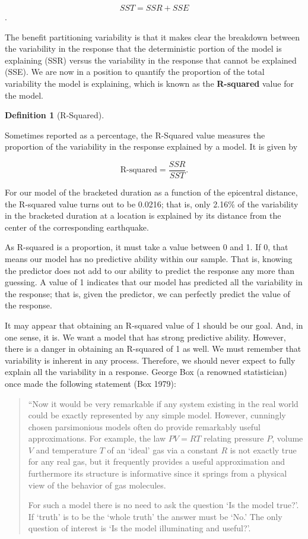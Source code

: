 \documentclass[
  letterpaper,
  DIV=11,
  numbers=noendperiod]{scrreprt}
\theoremstyle{definition}
\newtheorem{definition}{Definition}[chapter]
\theoremstyle{definition}
\theoremstyle{plain}
\theoremstyle{remark}
\begin{document}
\[SST = SSR + SSE\].

The benefit partitioning variability is that it makes clear the
breakdown between the variability in the response that the deterministic
portion of the model is explaining (SSR) versus the variability in the
response that cannot be explained (SSE). We are now in a position to
quantify the proportion of the total variability the model is
explaining, which is known as the \textbf{R-squared} value for the
model.

\begin{definition}[R-Squared]\protect\hypertarget{def-r-squared}{}\label{def-r-squared}

Sometimes reported as a percentage, the R-Squared value measures the
proportion of the variability in the response explained by a model. It
is given by

\[\text{R-squared} = \frac{SSR}{SST}.\]

\end{definition}

For our model of the bracketed duration as a function of the epicentral
distance, the R-squared value turns out to be 0.0216; that is, only
2.16\% of the variability in the bracketed duration at a location is
explained by its distance from the center of the corresponding
earthquake.

As R-squared is a proportion, it must take a value between 0 and 1. If
0, that means our model has no predictive ability within our sample.
That is, knowing the predictor does not add to our ability to predict
the response any more than guessing. A value of 1 indicates that our
model has predicted all the variability in the response; that is, given
the predictor, we can perfectly predict the value of the response.

It may appear that obtaining an R-squared value of 1 should be our goal.
And, in one sense, it is. We want a model that has strong predictive
ability. However, there is a danger in obtaining an R-squared of 1 as
well. We must remember that variability is inherent in any process.
Therefore, we should never expect to fully explain all the variability
in a response. George Box (a renowned statistician) once made the
following statement (Box 1979):

\begin{quote}
``Now it would be very remarkable if any system existing in the real
world could be exactly represented by any simple model. However,
cunningly chosen parsimonious models often do provide remarkably useful
approximations. For example, the law \(PV = RT\) relating pressure
\(P\), volume \(V\) and temperature \(T\) of an `ideal' gas via a
constant \(R\) is not exactly true for any real gas, but it frequently
provides a useful approximation and furthermore its structure is
informative since it springs from a physical view of the behavior of gas
molecules.

For such a model there is no need to ask the question `Is the model
true?'. If `truth' is to be the `whole truth' the answer must be `No.'
The only question of interest is `Is the model illuminating and
useful?'.
\end{quote}
\end{document}
